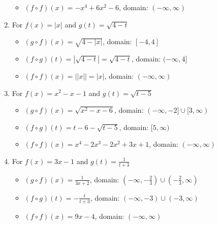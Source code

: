 \documentclass{ximera}
\begin{document}
\begin{enumerate}
\begin{itemize}
\item  $(f \circ f)(x) = -x^4+6x^2-6$, domain: $(-\infty, \infty)$

\end{itemize}

\item For   $f(x) = |x|$ and $g(t) = \sqrt{4-t}$

\begin{itemize}

\item  $(g \circ f)(x) = \sqrt{4-|x|}$, domain: $[-4,4]$

\item  $(f \circ g)(t) =|\sqrt{4-t}| = \sqrt{4-t}$, domain: $(-\infty, 4]$

\item  $(f \circ f)(x) = | |x| | = |x|$, domain: $(-\infty, \infty)$

\end{itemize}


\enlargethispage{0.25in}

\item For  $f(x) = x^2-x-1$ and $g(t) = \sqrt{t-5}$ 

\begin{itemize}

\item  $(g \circ f)(x) = \sqrt{x^2-x-6}$, domain: $(-\infty, -2] \cup [3,\infty)$

\item  $(f \circ g)(t) =t-6-\sqrt{t-5}$, domain: $[5,\infty)$

\item  $(f \circ f)(x) =x^4-2x^3-2x^2+3x+1$, domain: $(-\infty, \infty)$

\end{itemize}


\item For   $f(x) = 3x-1$ and $g(t) = \frac{1}{t+3}$

\begin{itemize}

\item  $(g \circ f)(x) = \frac{1}{3x+2}$, domain: $\left(-\infty, -\frac{2}{3}\right) \cup \left(-\frac{2}{3}, \infty\right)$

\item  $(f \circ g)(t) = -\frac{t}{t+3}$, domain: $\left(-\infty, -3\right) \cup \left(-3, \infty\right)$

\item  $(f \circ f)(x) = 9x-4$, domain: $(-\infty, \infty)$


\end{itemize}
\end{enumerate}
\end{document}
